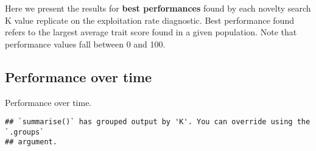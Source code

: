 \documentclass[]{book}
\newenvironment{Shaded}{\begin{snugshade}}{\end{snugshade}}
\newcommand{\DataTypeTok}[1]{\textcolor[rgb]{0.13,0.29,0.53}{#1}}
\newcommand{\KeywordTok}[1]{\textcolor[rgb]{0.13,0.29,0.53}{\textbf{#1}}}
\newcommand{\NormalTok}[1]{#1}
\newcommand{\OperatorTok}[1]{\textcolor[rgb]{0.81,0.36,0.00}{\textbf{#1}}}
\newcommand{\StringTok}[1]{\textcolor[rgb]{0.31,0.60,0.02}{#1}}
\begin{document}
Here we present the results for \textbf{best performances} found by each novelty search K value replicate on the exploitation rate diagnostic.
Best performance found refers to the largest average trait score found in a given population.
Note that performance values fall between 0 and 100.

\hypertarget{performance-over-time-22}{%
\subsection{Performance over time}\label{performance-over-time-22}}

Performance over time.

\begin{Shaded}
\end{Shaded}

\begin{verbatim}
## `summarise()` has grouped output by 'K'. You can override using the `.groups`
## argument.
\end{verbatim}
\end{document}
